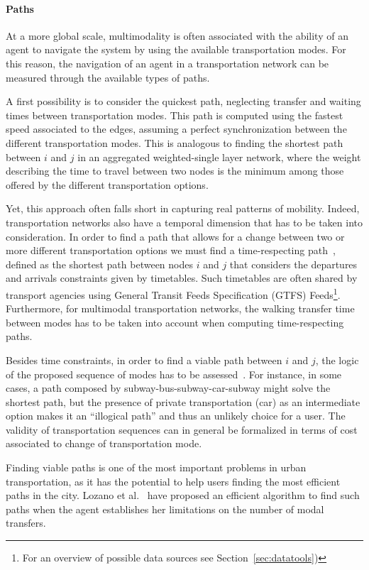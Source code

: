 \paragraph*{Paths} 
At a more global scale, multimodality is often associated with the ability of an agent to navigate the system by using the available transportation modes. For this reason, the navigation of an agent in a transportation network can be measured through the available types of paths.

A first possibility is to consider the quickest path, neglecting transfer and waiting times between transportation modes. This path is computed using the fastest speed associated to the edges, assuming a perfect synchronization between the different transportation modes. This is analogous to finding the shortest path between $i$ and $j$ in an aggregated weighted-single layer network, where the weight describing the time to travel between two nodes is the minimum among those offered by the different transportation options.

Yet, this approach often falls short in capturing real patterns of mobility. Indeed, transportation networks also have a temporal dimension that has to be taken into consideration. In order to find a path that allows for a change between two or more different transportation options we must find a time-respecting path~\cite{Gallotti2014Efficiency}, defined as the shortest path between nodes $i$ and $j$ that considers the departures and arrivals constraints given by timetables. Such timetables are often shared by transport agencies using General Transit Feeds Specification (GTFS) Feeds\footnote{For an overview of possible data sources see Section~\ref{sec:datatools})}. Furthermore, for multimodal transportation networks, the walking transfer time between modes has to be taken into account when computing time-respecting paths.

Besides time constraints, in order to find a viable path between $i$ and $j$, the logic of the proposed sequence of modes has to be assessed~\cite{battista1996path,lozano2001path}. For instance, in some cases, a path composed by subway-bus-subway-car-subway might solve the shortest path, but the presence of private transportation (car) as an intermediate option makes it an ``illogical path'' and thus an unlikely choice for a user. The validity of transportation sequences can in general be formalized in terms of cost associated to change of transportation mode.

Finding viable paths is one of the most important problems in urban transportation, as it has the potential to help users finding the most efficient paths in the city. Lozano et al.~\cite{lozano2001path} have proposed an efficient algorithm to find such paths when the agent establishes her limitations on the number of modal transfers.

